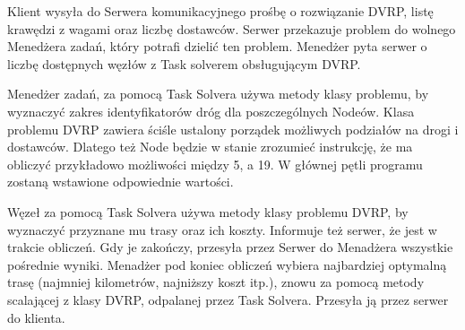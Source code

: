 \documentclass[12pt,a4paper,titlepage]{report}
\begin{document}
		Klient wysyła do Serwera komunikacyjnego prośbę o rozwiązanie DVRP, listę krawędzi z wagami oraz liczbę dostawców. Serwer przekazuje problem do wolnego Menedżera zadań, który potrafi dzielić ten problem. Menedżer pyta serwer o liczbę dostępnych węzłów z Task solverem obsługującym DVRP.
		
		Menedżer zadań, za pomocą Task Solvera używa metody klasy problemu, by wyznaczyć zakres identyfikatorów dróg dla poszczególnych Nodeów. Klasa problemu DVRP zawiera ściśle ustalony porządek możliwych podziałów na drogi i dostawców. Dlatego też Node będzie w stanie zrozumieć instrukcję, że ma obliczyć przykładowo możliwości między 5, a 19. W głównej pętli programu zostaną wstawione odpowiednie wartości.
		
		Węzeł za pomocą Task Solvera używa metody klasy problemu DVRP, by wyznaczyć przyznane mu trasy oraz ich koszty. Informuje też serwer, że jest w trakcie obliczeń. Gdy je zakończy, przesyła przez Serwer do Menadżera wszystkie pośrednie wyniki. Menadżer pod koniec obliczeń wybiera najbardziej optymalną trasę (najmniej kilometrów, najniższy koszt  itp.), znowu za pomocą metody scalającej z klasy DVRP, odpalanej przez Task Solvera. Przesyła ją przez serwer do klienta.
		
\end{document}
